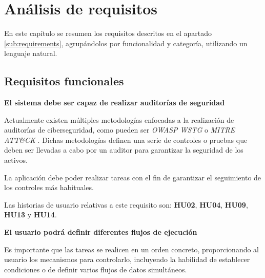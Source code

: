 

\chapter{Análisis de requisitos} \label{cap:requirements}

En este capítulo se resumen los requisitos descritos en el apartado \ref{sub:requirements}, agrupándolos por funcionalidad y categoría, utilizando un lenguaje natural.\n


\section{Requisitos funcionales} \label{sub:funcrequirements}
\vspace{1cm}

\textbf{El sistema debe ser capaz de realizar auditorías de seguridad}\sn

Actualmente existen múltiples metodologías enfocadas a la realización de auditorías de ciberseguridad, como pueden ser \textit{OWASP WSTG} \cite{owaspwstg} o \textit{MITRE ATT\&CK} \cite{mitre}. Dichas metodologías definen una serie de controles o pruebas que deben ser llevadas a cabo por un auditor para garantizar la seguridad de los activos.\sn

La aplicación debe poder realizar tareas con el fin de garantizar el seguimiento de los controles más habituales.\sn

Las historias de usuario relativas a este requisito son: \footnotesize\color{black!90}
\textbf{HU02}, \textbf{HU04}, \textbf{HU09}, \textbf{HU13} y \textbf{HU14}.
\normalsize\color{black}\n

\textbf{El usuario podrá definir diferentes flujos de ejecución}\sn

Es importante que las tareas se realicen en un orden concreto, proporcionando al usuario los mecanismos para controlarlo, incluyendo la habilidad de establecer condiciones o de definir varios flujos de datos simultáneos.\sn

